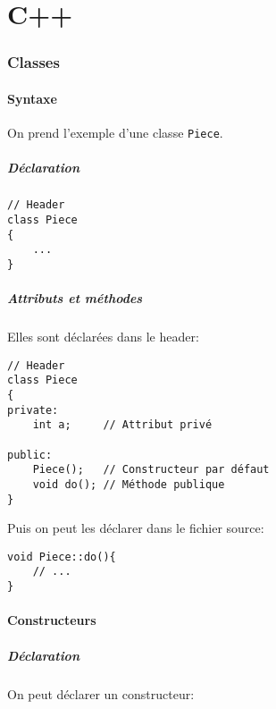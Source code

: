 \documentclass[10pt,a4paper,french]{article}
\begin{document}
\part{C++}

\section{Classes}

\subsection{Syntaxe}

On prend l'exemple d'une classe {\tt Piece}.

\subsubsection{Déclaration}

\begin{verbatim}
// Header
class Piece
{
    ...
}
\end{verbatim}

\subsubsection{Attributs et méthodes}

Elles sont déclarées dans le header:

\begin{verbatim}
// Header
class Piece
{
private:
    int a;     // Attribut privé

public:
    Piece();   // Constructeur par défaut
    void do(); // Méthode publique
}
\end{verbatim}

Puis on peut les déclarer dans le fichier source:

\begin{verbatim}
void Piece::do(){
    // ...
}
\end{verbatim}

\subsection{Constructeurs}

\subsubsection{Déclaration}

On peut déclarer un constructeur:
\end{document}
